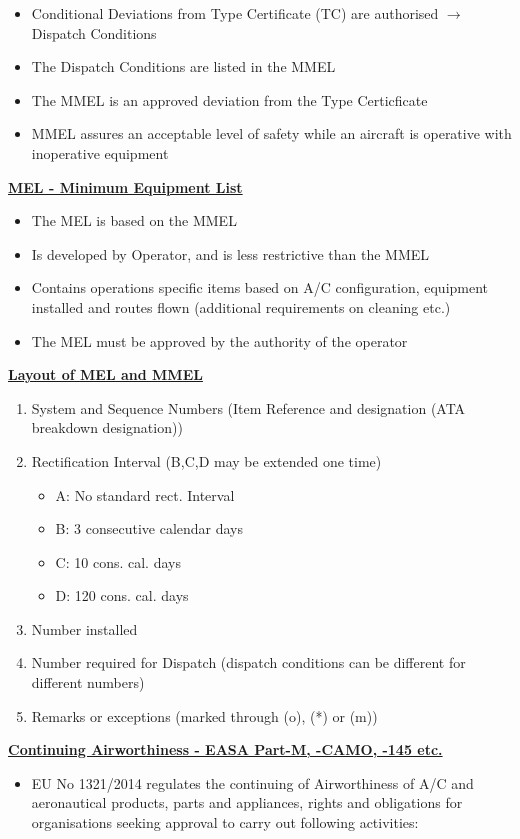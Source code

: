\documentclass[9pt, landscape, fleqn]{scrartcl}
\begin{document}
\begin{multicols*}{3}
\begin{itemize}
    \item Conditional Deviations from Type Certificate (TC) are authorised $\rightarrow$ Dispatch Conditions 
    \item The Dispatch Conditions are listed in the MMEL 
    \item The MMEL is an approved deviation from the Type Certicficate
    \item MMEL assures an acceptable level of safety while an aircraft is operative with inoperative equipment
\end{itemize}
\underline{\textbf{MEL - Minimum Equipment List}}
\begin{itemize}
    \item The MEL is based on the MMEL
    \item Is developed by Operator, and is less restrictive than the MMEL
    \item Contains operations specific items based on A/C configuration, equipment installed and routes flown (additional requirements on cleaning etc.)
    \item The MEL must be approved by the authority of the operator 
\end{itemize}
\underline{\textbf{Layout of MEL and MMEL}}
\begin{enumerate}
    \item System and Sequence Numbers (Item Reference and designation (ATA breakdown designation))
    \item Rectification Interval (B,C,D may be extended one time)
    \begin{itemize}
        \item A: No standard rect. Interval
        \item B: 3 consecutive calendar days 
        \item C: 10 cons. cal. days 
        \item D: 120 cons. cal. days
    \end{itemize}
    \item Number installed 
    \item Number required for Dispatch (dispatch conditions can be different for different numbers)
    \item Remarks or exceptions (marked through (o), (*) or (m))
\end{enumerate}
\underline{\textbf{Continuing Airworthiness - EASA Part-M, -CAMO, -145 etc.}}
\begin{itemize}
    \item EU No 1321/2014 regulates the continuing of Airworthiness of A/C and aeronautical products, parts and appliances, rights and obligations for organisations seeking approval to carry out following activities:

\end{itemize}
\end{multicols*}
\end{document}
